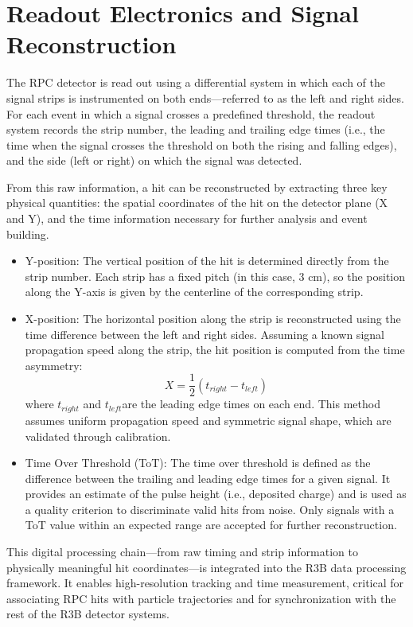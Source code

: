 {{{\section{Readout Electronics and Signal Reconstruction}

The \gls{RPC} detector is read out using a differential system in which each of the signal strips is instrumented on both ends—referred to as the left and right sides. For each event in which a signal crosses a predefined threshold, the readout system records the strip number, the leading and trailing edge times (i.e., the time when the signal crosses the threshold on both the rising and falling edges), and the side (left or right) on which the signal was detected.

From this raw information, a hit can be reconstructed by extracting three key physical quantities: the spatial coordinates of the hit on the detector plane (X and Y), and the time information necessary for further analysis and event building.

\begin{itemize}
	\item Y-position: The vertical position of the hit is determined directly from the strip number. Each strip has a fixed pitch (in this case, 3 cm), so the position along the Y-axis is given by the centerline of the corresponding strip.
	\item X-position: The horizontal position along the strip is reconstructed using the time difference between the left and right sides. Assuming a known signal propagation speed along the strip, the hit position is computed from the time asymmetry:
	\[X = \frac{1}{2}(t_{right} - t_{left})\]
	where $t_{right}$ and $t_{left}$​ are the leading edge times on each end. This method assumes uniform propagation speed and symmetric signal shape, which are validated through calibration.
	\item Time Over Threshold (ToT): The time over threshold is defined as the difference between the trailing and leading edge times for a given signal. It provides an estimate of the pulse height (i.e., deposited charge) and is used as a quality criterion to discriminate valid hits from noise. Only signals with a ToT value within an expected range are accepted for further reconstruction.
\end{itemize}

This digital processing chain—from raw timing and strip information to physically meaningful hit coordinates—is integrated into the \gls{R3B} data processing framework. It enables high-resolution tracking and time measurement, critical for associating \gls{RPC} hits with particle trajectories and for synchronization with the rest of the \gls{R3B} detector systems.

}}}
